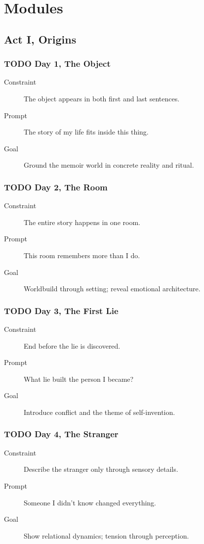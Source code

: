 \documentclass[11pt]{article}
\begin{document}
\section*{Modules}
\label{sec:org556e2cc}
\startcontents[level-1]
\subsection*{Act I, Origins}
\label{sec:org92ea71e}
\subsubsection*{{\bfseries\sffamily TODO} Day 1, The Object}
\label{sec:orga8520ca}
\begin{description}
\item[{Constraint}] The object appears in both first and last sentences.
\item[{Prompt}] The story of my life fits inside this thing.
\item[{Goal}] Ground the memoir world in concrete reality and ritual.
\end{description}
\subsubsection*{{\bfseries\sffamily TODO} Day 2, The Room}
\label{sec:org525d599}
\begin{description}
\item[{Constraint}] The entire story happens in one room.
\item[{Prompt}] This room remembers more than I do.
\item[{Goal}] Worldbuild through setting; reveal emotional architecture.
\end{description}
\subsubsection*{{\bfseries\sffamily TODO} Day 3, The First Lie}
\label{sec:orgc2fc507}
\begin{description}
\item[{Constraint}] End before the lie is discovered.
\item[{Prompt}] What lie built the person I became?
\item[{Goal}] Introduce conflict and the theme of self-invention.
\end{description}
\subsubsection*{{\bfseries\sffamily TODO} Day 4, The Stranger}
\label{sec:orgc166760}
\begin{description}
\item[{Constraint}] Describe the stranger only through sensory details.
\item[{Prompt}] Someone I didn’t know changed everything.
\item[{Goal}] Show relational dynamics; tension through perception.
\end{description}
\end{document}
